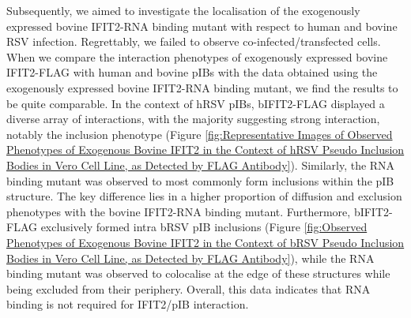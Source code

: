 Subsequently, we aimed to investigate the localisation of the exogenously expressed bovine IFIT2-RNA binding mutant with respect to human and bovine RSV infection. Regrettably, we failed to observe co-infected/transfected cells. When we compare the interaction phenotypes of exogenously expressed bovine IFIT2-FLAG with human and bovine pIBs with the data obtained using the exogenously expressed bovine IFIT2-RNA binding mutant, we find the results to be quite comparable. In the context of hRSV pIBs, bIFIT2-FLAG displayed a diverse array of interactions, with the majority suggesting strong interaction, notably the inclusion phenotype (Figure \ref{fig:Representative Images of Observed Phenotypes of Exogenous Bovine IFIT2 in the Context of hRSV Pseudo Inclusion Bodies in Vero Cell Line, as Detected by FLAG Antibody}). Similarly, the RNA binding mutant was observed to most commonly form inclusions within the pIB structure. The key difference lies in a higher proportion of diffusion and exclusion phenotypes with the bovine IFIT2-RNA binding mutant. Furthermore, bIFIT2-FLAG exclusively formed intra bRSV pIB inclusions (Figure \ref{fig:Observed Phenotypes of Exogenous Bovine IFIT2 in the Context of bRSV Pseudo Inclusion Bodies in Vero Cell Line, as Detected by FLAG Antibody}), while the RNA binding mutant was observed to colocalise at the edge of these structures while being excluded from their periphery. Overall, this data indicates that RNA binding is not required for IFIT2/pIB interaction.